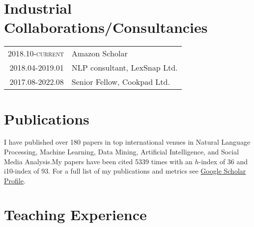 \documentclass[a4paper,11pt]{article}
\begin{document}
\section{Industrial Collaborations/Consultancies}

\begin{tabular}{r p{11cm}}
\textsc{2018.10-current} & Amazon Scholar\\
\textsc{2018.04-2019.01} & NLP consultant, LexSnap Ltd.\\
\textsc{2017.08-2022.08} & Senior Fellow, Cookpad Ltd. \\
\end{tabular}


\newpage
\section{Publications}

I have published over 180 papers in top international venues in Natural Language Processing, Machine Learning, Data Mining, Artificial Intelligence, and Social Media Analysis.My papers have been cited 5339 times with an $h$-index of 36 and i10-index of 93.
For a full list of my publications and metrics see \href{https://goo.gl/mnhgp6}{Google Scholar Profile}.



%

\section{Teaching Experience}
\end{document}

